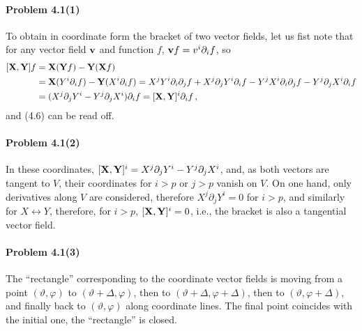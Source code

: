\documentclass[a4paper,12pt]{article}
\newcommand{\problem}[1]{\paragraph{Problem #1}}
\begin{document}

\problem{4.1(1)} To obtain in coordinate form the bracket of two vector fields, let us fist note that for any vector field ${\bf v}$ and function $f$, ${\bf v}f = v^i \partial_i f$, so
\[\begin{aligned}[]
 [{\bf X}, {\bf Y}] f &= {\bf X}({\bf Y}f) - {\bf Y}({\bf X} f)\\ &= {\bf X}(Y^i\partial_i f) - {\bf Y} (X^i\partial_i f) = X^j Y^i \partial_i \partial_j f + X^j \partial_j Y^i \partial_i f - Y^j X^i \partial_i \partial_j f - Y^j \partial_j X^i \partial_i f\\ &= (X^j \partial_j Y^i - Y^j \partial_j X^i) \partial_i f = [{\bf X}, {\bf Y}]^i \partial_i f\,,
\end{aligned}\]
and (4.6) can be read off.


\problem{4.1(2)} In these coordinates, $[{\bf X}, {\bf Y}]^i = X^j \partial_j Y^i - Y^j \partial_j X^i$, and, as both vectors are tangent to $V$, their coordinates for $i>p$ or $j>p$ vanish on $V$. On one hand, only derivatives along $V$ are considered, therefore $X^j \partial_j Y^i = 0$ for $i>p$, and similarly for $X\leftrightarrow Y$, therefore, for $i>p$, $[{\bf X},{\bf Y}]^i=0$, i.e., the bracket is also a tangential vector field.


\problem{4.1(3)} The ``rectangle'' corresponding to the coordinate vector fields is moving from a point $(\vartheta, \varphi)$ to $(\vartheta + \Delta, \varphi)$, then to $(\vartheta + \Delta, \varphi + \Delta)$, then to $(\vartheta, \varphi + \Delta)$, and finally back to $(\vartheta, \varphi)$ along coordinate lines. The final point coincides with the initial one, the ``rectangle'' is closed.
\end{document}
